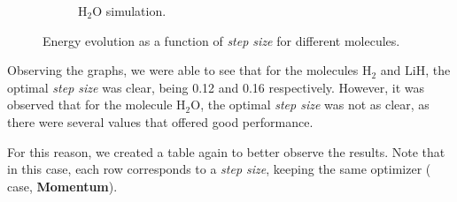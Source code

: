 \begin{figure}[H]
\begin{subfigure}{0.45\textwidth}
    \caption{H$_2$O simulation.}
    \label{fig:step_size_h2o}
  \end{subfigure}
  \caption{Energy evolution as a function of \textit{step size} for different molecules.}
  \label{fig:step_size_results}
\end{figure}
Observing the graphs, we were able to see that for the molecules \(\mathrm{H_2}\) and \(\mathrm{LiH}\), the optimal \emph{step size} was clear, being 0.12 and 0.16 respectively. However, it was observed that for the molecule \(\mathrm{H_2O}\), the optimal \emph{step size} was not as clear, as there were several values that offered good performance.

For this reason, we created a table again to better observe the results. Note that in this case, each row corresponds to a \textit{step size}, keeping the same optimizer (  case, \textbf{Momentum}).


